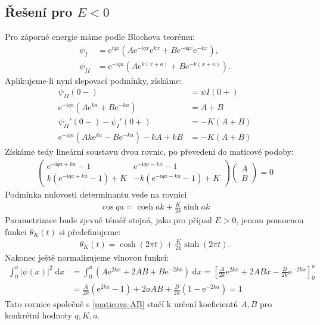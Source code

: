 \documentclass[10pt,a4paper]{article}
\newcommand{\const}[1]{\text{#1}}
\newcommand{\mat}[1]{
    \begin{pmatrix}
        #1
    \end{pmatrix}
}
\renewcommand{\d}[1]{\;\const{d}#1}
\newcommand{\e}[1]{\const{e}^{#1}}
\renewcommand{\i}{\const{i}}
\begin{document}
\subsection{Řešení pro $E<0$}

Pro záporné energie máme podle Blochova teorému:
\begin{align*}
    \psi_I &= \e{\i q x} \left( A \e{-\i q x} \e{kx} + B \e{-\i q x} \e{-kx} \right), \\
    \psi_{II} &= \e{-\i q a} \left( A \e{k(x+a)} + B \e{-k(x+a)} \right).
\end{align*}
Aplikujeme-li nyní slepovací podmínky, získáme:
\begin{align*}
    \psi_{II}(0-) &= \psi{I}(0+) \\
    \e{-\i q a} \left( A \e{ka} +  B \e{-ka}\right) &= A + B
    \\[10pt]
    \psi_{II}'(0-) - \psi_I'(0+) &= - K(A+B) \\
    \e{-\i q a}\left( Ak\e{ka} - B\e{-ka} \right) -kA + kB &= -K(A+B)
\end{align*}
Získáme tedy lineární soustavu dvou rovnic, po převedení do maticové podoby:
\begin{gather}
    \mat{
        \e{-\i qa + ka} - 1 &
        \e{-\i qa - ka} - 1 \\
        k\left(\e{-\i qa + ka} - 1\right) + K &
        -k\left(\e{-\i qa - ka} - 1\right) + K
    }
    \mat{A \\ B} = 0
    \label{maticova-AB}
\end{gather}
Podmínka nulovosti determinantu vede na rovnici
\begin{gather*}
    \cos qa = \cosh ak + \frac{K}{2k} \sinh ak
\end{gather*}
Parametrizace bude zjevně téměř stejná, jako pro případ $E>0$, jenom pomocnou funkci $\theta_K(t)$ si předefinujeme:
\begin{gather*}
    \theta_K(t) = \cosh(2\pi t) + \frac{K}{2k} \sinh(2\pi t).
\end{gather*}
Nakonec ještě normalizujeme vlnovou funkci:
\begin{align*}
    \int_0^a |\psi(x)|^2 \d{x} &=
    \int_0^a \left( A\e{2kx} + 2AB + B\e{-2kx} \right) \d{x} =
    \left[ \frac{A}{2k} \e{2kx} + 2ABx - \frac{B}{2k} \e{-2kx}\right]_0^a
    \\
    &= \frac{A}{2k} \left( \e{2ka} - 1 \right) + 2aAB + \frac{B}{2k} \left( 1 - \e{-2ka} \right)
    = 1
\end{align*}
Tato rovnice společně s \eqref{maticova-AB} stačí k určení koeficientů $A, B$ pro konkrétní hodnoty $q, K, a$.
\end{document}
